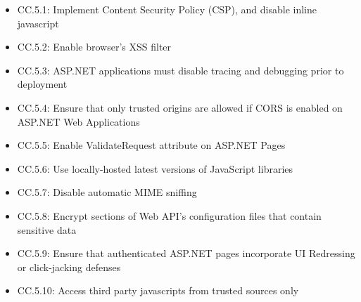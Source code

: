 \begin{itemize}
    \item CC.5.1: Implement Content Security Policy (CSP), and disable inline javascript
    \item CC.5.2: Enable browser's XSS filter
    \item CC.5.3: ASP.NET applications must disable tracing and debugging prior to deployment
    \item CC.5.4: Ensure that only trusted origins are allowed if CORS is enabled on ASP.NET Web Applications
    \item CC.5.5: Enable ValidateRequest attribute on ASP.NET Pages
    \item CC.5.6: Use locally-hosted latest versions of JavaScript libraries
    \item CC.5.7: Disable automatic MIME sniffing
    \item CC.5.8: Encrypt sections of Web API's configuration files that contain sensitive data
    \item CC.5.9: Ensure that authenticated ASP.NET pages incorporate UI Redressing or click-jacking defenses
    \item CC.5.10: Access third party javascripts from trusted sources only
\end{itemize}

